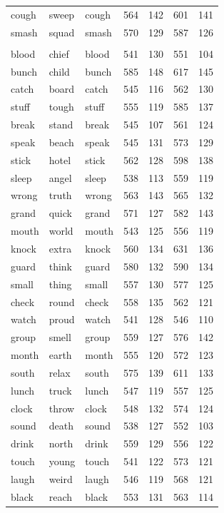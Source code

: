 \documentclass[
]{interact}
\begin{document}
\begin{longtable*}{lllrrrr}
cough & sweep & cough & 564 & 142 & 601 & 141 \\ 
smash & squad & smash & 570 & 129 & 587 & 126 \\ 
\midrule\addlinespace[2.5pt]
 \\ 
\midrule\addlinespace[2.5pt]
blood & chief & blood & 541 & 130 & 551 & 104 \\ 
bunch & child & bunch & 585 & 148 & 617 & 145 \\ 
catch & board & catch & 545 & 116 & 562 & 130 \\ 
stuff & tough & stuff & 555 & 119 & 585 & 137 \\ 
break & stand & break & 545 & 107 & 561 & 124 \\ 
speak & beach & speak & 545 & 131 & 573 & 129 \\ 
stick & hotel & stick & 562 & 128 & 598 & 138 \\ 
sleep & angel & sleep & 538 & 113 & 559 & 119 \\ 
wrong & truth & wrong & 563 & 143 & 565 & 132 \\ 
grand & quick & grand & 571 & 127 & 582 & 143 \\ 
mouth & world & mouth & 543 & 125 & 556 & 119 \\ 
knock & extra & knock & 560 & 134 & 631 & 136 \\ 
guard & think & guard & 580 & 132 & 590 & 134 \\ 
small & thing & small & 557 & 130 & 577 & 125 \\ 
check & round & check & 558 & 135 & 562 & 121 \\ 
watch & proud & watch & 541 & 128 & 546 & 110 \\ 
group & smell & group & 559 & 127 & 576 & 142 \\ 
month & earth & month & 555 & 120 & 572 & 123 \\ 
south & relax & south & 575 & 139 & 611 & 133 \\ 
lunch & truck & lunch & 547 & 119 & 557 & 125 \\ 
clock & throw & clock & 548 & 132 & 574 & 124 \\ 
sound & death & sound & 538 & 127 & 552 & 103 \\ 
drink & north & drink & 559 & 129 & 556 & 122 \\ 
touch & young & touch & 541 & 122 & 573 & 121 \\ 
laugh & weird & laugh & 546 & 119 & 568 & 121 \\ 
black & reach & black & 553 & 131 & 563 & 114 \\ 

\end{longtable*}
\end{document}
